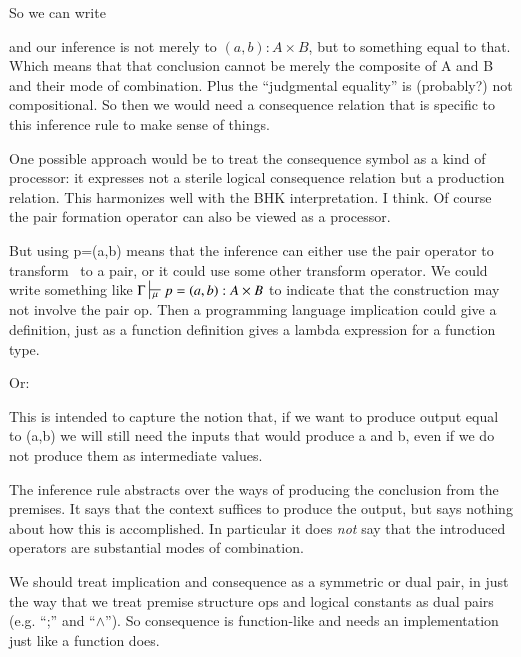 So we can write


and our inference is not merely to \((a,b):A\times B\), but to
something equal to that. Which means that that conclusion cannot be
merely the composite of A and B and their mode of combination. Plus
the ``judgmental equality'' is (probably?) not compositional. So then
we would need a consequence relation that is specific to this
inference rule to make sense of things.

One possible approach would be to treat the consequence symbol as a
kind of processor: it expresses not a sterile logical consequence
relation but a production relation. This harmonizes well with the BHK
interpretation. I think. Of course the pair formation operator can
also be viewed as a processor.

But using p=(a,b) means that the inference can either use the pair
operator to transform \ContextG\ to a pair, or it could use some other
transform operator. We could write something like
\(\Gamma\sststile{\mu}{} p=(a,b): A\times B\) to indicate that the
construction may not involve the pair op. Then a programming language
implication could give a definition, just as a function definition
gives a lambda expression for a function type.

Or:


This is intended to capture the notion that, if we want to produce
output equal to (a,b) we will still need the inputs that would produce
a and b, even if we do not produce them as intermediate values.

The inference rule abstracts over the ways of producing the conclusion
from the premises. It says that the context suffices to produce the
output, but says nothing about how this is accomplished. In particular
it does \textit{not} say that the introduced operators are substantial
modes of combination.

We should treat implication and consequence as a symmetric or dual
pair, in just the way that we treat premise structure ops and logical
constants as dual pairs (e.g. ``;'' and ``\(\land\)''). So consequence
is function-like and needs an implementation just like a function
does.

